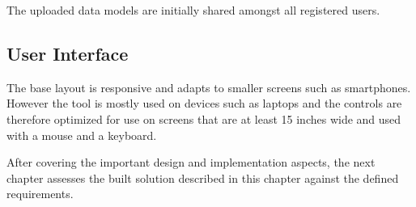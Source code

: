 The uploaded data models are initially shared amongst all registered users.

\subsection{User Interface}

The base layout is responsive and adapts to smaller screens such as smartphones. However the tool is mostly used on devices such as laptops and the controls are therefore optimized for use on screens that are at least 15 inches wide and used with a mouse and a keyboard.


\bigskip
After covering the important design and implementation aspects, the next chapter assesses the built solution described in this chapter against the defined requirements.
